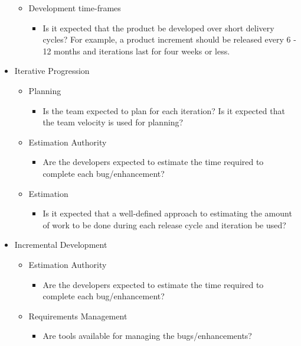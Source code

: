\begin{appendices}
\begin{itemize}
\begin{itemize}
			\item Development time-frames
				\begin{itemize}
					\item Is it expected that the product be developed over short delivery cycles? For example, a product increment should be released every 6 - 12 months and iterations last for four weeks or less.
				\end{itemize}
		\end{itemize}
	\item Iterative Progression
		\begin{itemize}
			\item Planning
				\begin{itemize}
					\item Is the team expected to plan for each iteration?
					\addition Is it expected that the team velocity is used for planning?
				\end{itemize}
			\item Estimation Authority
				\begin{itemize}
					\item Are the developers expected to estimate the time required to complete each bug/enhancement?
				\end{itemize}
			\item Estimation
				\begin{itemize}
					\item Is it expected that a well-defined approach to estimating the amount of work to be done during each release cycle and iteration be used?
				\end{itemize}
		\end{itemize}
	\item Incremental Development
		\begin{itemize}
			\item Estimation Authority
				\begin{itemize}
					\item Are the developers expected to estimate the time required to complete each bug/enhancement?
				\end{itemize}
			\item Requirements Management
				\begin{itemize}
					\item Are tools available for managing the bugs/enhancements?
				\end{itemize}

\end{itemize}
\end{itemize}
\end{appendices}
